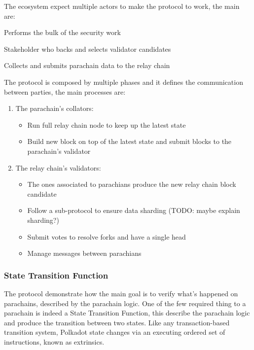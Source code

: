 \documentclass[../main.tex]{subfiles}
\begin{document}
The ecosystem expect multiple actors to make the protocol to work, the main are:
\begin{description}[font=$\bullet$ \scshape\bfseries]
  \item[Validator] Performs the bulk of the security work
  \item[Nonimator] Stakeholder who backs and selects validator candidates
  \item[Collator] Collects and submits parachain data to the relay chain
\end{description}

The protocol is composed by multiple phases and it defines the communication between parties, the main processes are:~\cite{burdges2020overview}

\begin{enumerate}
  \item The parachain's collators:
        \begin{itemize}
                \item Run full relay chain node to keep up the latest state
                \item Build new block on top of the latest state and submit blocks to the parachain's validator
        \end{itemize}
  \item The relay chain's validators:
    \begin{itemize}
      \item The ones associated to parachians produce the new relay chain block candidate
      \item Follow a sub-protocol to ensure data sharding (TODO: maybe explain sharding?)
      \item Submit votes to resolve forks and have a single head
      \item Manage messages between parachians
    \end{itemize}
\end{enumerate}

\subsubsection{State Transition Function}

The protocol demonstrate how the main goal is to verify what's happened on parachains, described by the parachain logic. One of the few required thing to a parachain is indeed a State Transition Function, this describe the parachain logic and produce the transition between two states. Like any transaction-based transition system, Polkadot state changes via an executing ordered set of instructions, known as extrinsics.~\cite{burdges2020overview}
\end{document}
